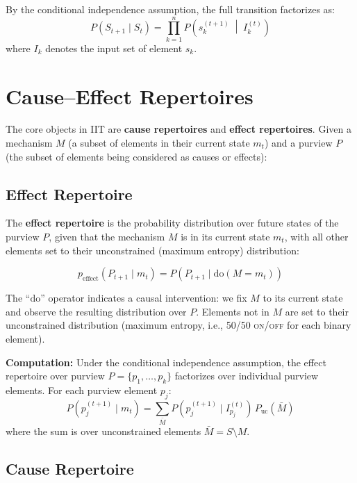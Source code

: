 \documentclass[11pt,a4paper]{report}
\begin{document}
By the conditional independence assumption, the full transition factorizes as:
\[
  P(S_{t+1} \mid S_t) = \prod_{k=1}^{n} P\!\left(s_k^{(t+1)} \;\middle|\; I_k^{(t)}\right)
\]
where $I_k$ denotes the input set of element $s_k$.

\section{Cause--Effect Repertoires}

The core objects in IIT are \textbf{cause repertoires} and \textbf{effect repertoires}. Given a mechanism $M$ (a subset of elements in their current state $m_t$) and a purview $P$ (the subset of elements being considered as causes or effects):

\subsection{Effect Repertoire}

The \textbf{effect repertoire} is the probability distribution over future states of the purview $P$, given that the mechanism $M$ is in its current state $m_t$, with all other elements set to their unconstrained (maximum entropy) distribution:

\begin{mathbox}
\vspace{-8pt}
\[
  p_{\text{effect}}(P_{t+1} \mid m_t) = P(P_{t+1} \mid \mathrm{do}(M = m_t))
\]
\vspace{-10pt}
\end{mathbox}

The ``$\mathrm{do}$'' operator indicates a causal intervention: we fix $M$ to its current state and observe the resulting distribution over $P$. Elements not in $M$ are set to their unconstrained distribution (maximum entropy, i.e., 50/50 \textsc{on}/\textsc{off} for each binary element).

\textbf{Computation:} Under the conditional independence assumption, the effect repertoire over purview $P = \{p_1, \ldots, p_k\}$ factorizes over individual purview elements. For each purview element $p_j$:
\[
  P(p_j^{(t+1)} \mid m_t) = \sum_{\bar{M}} P(p_j^{(t+1)} \mid I_{p_j}^{(t)})\, P_{\text{uc}}(\bar{M})
\]
where the sum is over unconstrained elements $\bar{M} = S \setminus M$.

\subsection{Cause Repertoire}
\end{document}
